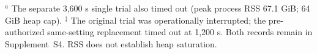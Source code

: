 \par{\scriptsize $^{a}$ The separate 3,600 s single trial also timed out (peak process RSS 67.1 GiB; 64 GiB heap cap). $^{\ddagger}$ The original trial was operationally interrupted; the pre-authorized same-setting replacement timed out at 1,200 s. Both records remain in Supplement~S4. RSS does not establish heap saturation.}
